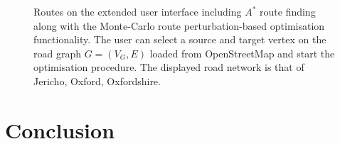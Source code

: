 \documentclass{prettytex/ox/mmsc-special-topic}
\begin{document}
  \begin{figure}[H]
    \captionsetup[subfigure]{justification=centering}
    \centering
    \hfill
    \par
    \vspace{0.5cm}
    \hfill
    \par
    \caption{Routes on the extended user interface including $A^*$ route finding along with the Monte-Carlo route perturbation-based optimisation functionality. The user can select a source and target vertex on the road graph $G = (V_G, E)$ loaded from OpenStreetMap and start the optimisation procedure. The displayed road network is that of Jericho, Oxford, Oxfordshire.}
  \end{figure}

  \section{Conclusion}
\end{document}
